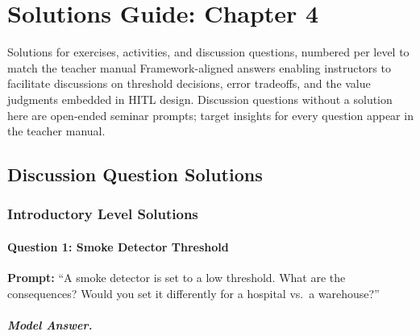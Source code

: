 
\chapter{Solutions Guide: Chapter 4}
\label{ch:solutions-ch04}

\begin{chapterquote}{Solutions for exercises, activities, and discussion questions, numbered per level to match the teacher manual}
Framework-aligned answers enabling instructors to facilitate discussions on threshold decisions, error tradeoffs, and the value judgments embedded in HITL design. Discussion questions without a solution here are open-ended seminar prompts; target insights for every question appear in the teacher manual.
\end{chapterquote}

\section{Discussion Question Solutions}

\subsection{Introductory Level Solutions}

\subsubsection{Question 1: Smoke Detector Threshold}

\textbf{Prompt:} ``A smoke detector is set to a low threshold. What are the consequences? Would you set it differently for a hospital vs.\ a warehouse?''

\paragraph{Model Answer.}

